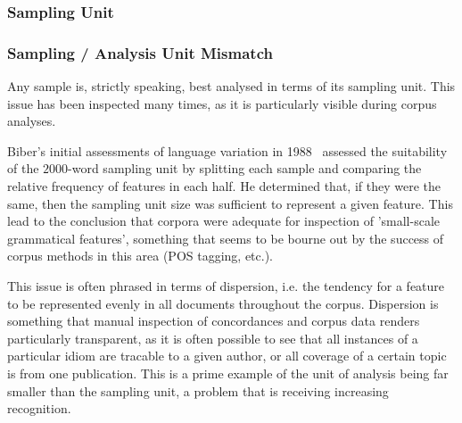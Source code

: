 




\subsubsection{Sampling Unit}

\subsubsection{Sampling / Analysis Unit Mismatch}
Any sample is, strictly speaking, best analysed in terms of its sampling unit. This issue has been inspected many times, as it is particularly visible during corpus analyses.

Biber's initial assessments of language variation in 1988~\cite{biber1988variation} assessed the suitability of the $2000$-word sampling unit by splitting each sample and comparing the relative frequency of features in each half.  He determined that, if they were the same, then the sampling unit size was sufficient to represent a given feature.  This lead to the conclusion that corpora were adequate for inspection of 'small-scale grammatical features', something that seems to be bourne out by the success of corpus methods in this area (POS tagging, etc.).

This issue is often phrased in terms of dispersion, i.e. the tendency for a feature to be represented evenly in all documents throughout the corpus.  Dispersion is something that manual inspection of concordances and corpus data renders particularly transparent, as it is often possible to see that all instances of a particular idiom are tracable to a given author, or all coverage of a certain topic is from one publication.  This is a prime example of the unit of analysis being far smaller than the sampling unit, a problem that is receiving increasing recognition.

